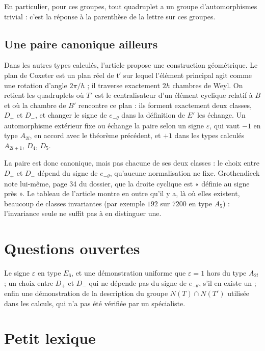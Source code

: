 \documentclass[11pt,a4paper]{amsart}
\theoremstyle{definition}
\theoremstyle{plain}
\theoremstyle{remark}
\newcommand{\tl}{\mathfrak t}
\begin{document}
En particulier, pour ces groupes, tout quadruplet a un groupe d'automorphismes trivial : c'est la réponse à la parenthèse de la lettre sur ces groupes.

\subsection{Une paire canonique ailleurs}

Dans les autres types calculés, l'article propose une construction géométrique. Le plan de Coxeter est un plan réel de $\tl'$ sur lequel l'élément principal agit comme une rotation d'angle $2\pi/h$ ; il traverse exactement $2h$ chambres de Weyl. On retient les quadruplets où $T'$ est le centralisateur d'un élément cyclique relatif à $B$ et où la chambre de $B'$ rencontre ce plan : ils forment exactement deux classes, $D_+$ et $D_-$, et changer le signe de $e_{-\theta}$ dans la définition de $E'$ les échange. Un automorphisme extérieur fixe ou échange la paire selon un signe $\varepsilon$, qui vaut $-1$ en type $A_{2l}$, en accord avec le théorème précédent, et $+1$ dans les types calculés $A_{2l+1}$, $D_4$, $D_5$.

La paire est donc canonique, mais pas chacune de ses deux classes : le choix entre $D_+$ et $D_-$ dépend du signe de $e_{-\theta}$, qu'aucune normalisation ne fixe. Grothendieck note lui-même, page 34 du dossier, que la droite cyclique est « définie au signe près ». Le tableau de l'article montre en outre qu'il y a, là où elles existent, beaucoup de classes invariantes (par exemple $192$ sur $7200$ en type $A_5$) : l'invariance seule ne suffit pas à en distinguer une.

\section{Questions ouvertes}

Le signe $\varepsilon$ en type $E_6$, et une démonstration uniforme que $\varepsilon = 1$ hors du type $A_{2l}$ ; un choix entre $D_+$ et $D_-$ qui ne dépende pas du signe de $e_{-\theta}$, s'il en existe un ; enfin une démonstration de la description du groupe $N(T) \cap N(T')$ utilisée dans les calculs, qui n'a pas été vérifiée par un spécialiste.

\section{Petit lexique}
\end{document}
